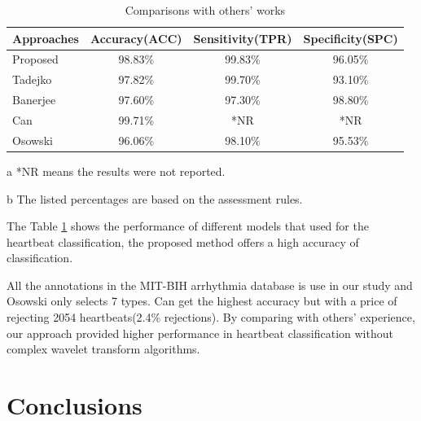 \documentclass[conference]{IEEEtran}
\begin{document}
\begin{table}[!htbp]
\small
\begin{center}
\begin{lrbox}{\tablebox}
\begin{threeparttable}
\caption{Comparisons with others' works}
\label{table5}
\begin{tabular}{lccc}
\hline

Approaches            	&  Accuracy(ACC)  & Sensitivity(TPR) & Specificity(SPC)\\
\hline
 Proposed             	&98.83\%   	  & 99.83\%  	 &96.05\%    \\
 Tadejko\cite{Tadejko}	& 97.82\%   	  & 99.70\%     &93.10\%    \\
 Banerjee\cite{Banerjee}&97.60\%  	  & 97.30\%     &98.80\%    \\
 Can\cite{Can}        	&99.71\%  	  & *NR         &*NR      \\
 Osowski\cite{Osowski}	&96.06\%   	  & 98.10\%     &95.53\%    \\
\hline
\end{tabular}
\begin{tablenotes}
\item [a] *NR means the results were not reported.
\item [b] The listed percentages are based on the assessment rules.
\end{tablenotes}
\end{threeparttable}
\end{lrbox}
\scalebox{0.92}{\usebox{\tablebox}}
\end{center}
\end{table}

The Table \ref{table5} shows the performance of different models that used for the heartbeat classification, the proposed method offers a high accuracy of classification. 

All the annotations in the MIT-BIH arrhythmia database is use in our study and Osowski\cite{Osowski} only selects 7 types. Can\cite{Can} get the highest accuracy but with a
price of rejecting 2054 heartbeats(2.4\% rejections). By comparing with others' experience, our approach provided higher performance in heartbeat classification without complex wavelet transform algorithms. 


\section{Conclusions}
\end{document}

